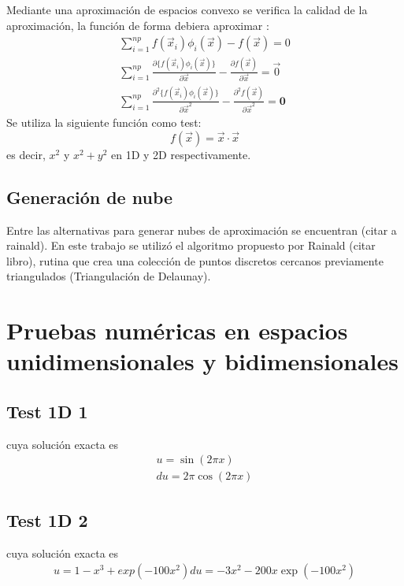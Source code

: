 Mediante una aproximación de espacios convexo se verifica la calidad de la aproximación, la función de forma debiera aproximar :
\begin{eqnarray}
    \sum_{i=1}^{np} f(\vec{x}_i) \phi_i(\vec{x}) - f(\vec{x}) = 0 \\
    \sum_{i=1}^{np} \frac{\partial\{f(\vec{x}_i)\phi_i(\vec{x})\}}{\partial \vec{x}} - \frac{\partial f(\vec{x})}{\partial \vec{x}} = \vec{0} \\
    \sum_{i=1}^{np} \frac{\partial^2\{f(\vec{x}_i)\phi_i(\vec{x})\}}{\partial \vec{x}^2} - \frac{\partial^2 f(\vec{x})}{\partial \vec{x}^2} = \textbf{0}
\end{eqnarray}
Se utiliza la siguiente función como test:
\begin{equation}
    f(\vec{x}) = \vec{x} \cdot \vec{x}
\end{equation}
es decir, $x^2$ y $x^2+y^2$ en 1D y 2D respectivamente.


\subsection{Generación de nube}
Entre las alternativas para generar nubes de aproximación se encuentran (citar a rainald). En este trabajo se utilizó el algoritmo propuesto por Rainald (citar libro), rutina que crea una colección de puntos discretos cercanos previamente triangulados (Triangulación de Delaunay).

\section{Pruebas numéricas en espacios unidimensionales y bidimensionales}

\subsection{Test 1D 1}
cuya solución exacta es
\begin{eqnarray}
    u = \sin( 2 \pi x ) \\
    du = 2 \pi \cos( 2 \pi x )
\end{eqnarray}

\subsection{Test 1D 2}
cuya solución exacta es
\begin{eqnarray}
    u  = 1 - x^3 + exp(-100 x^2 )
    du = - 3 x^2 -200 x \exp(-100 x^2 )
\end{eqnarray}

